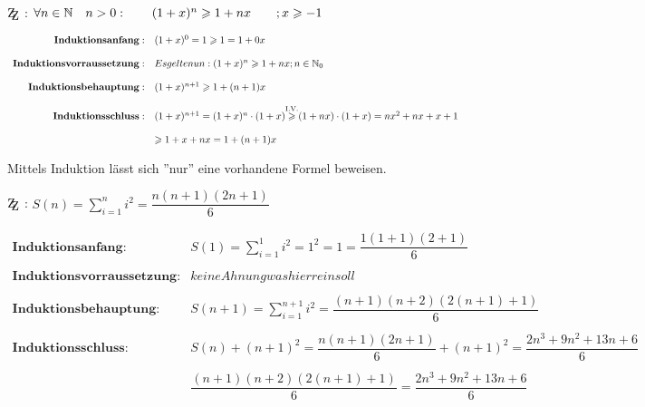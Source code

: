 \documentclass[main.tex]{subfiles}
\begin{document}
\begin{Beweis}
	$\mathrm{Z\kern-.3em\raise-0.5ex\hbox{Z}}$ : $ \forall n \in \mathbb{N} \quad n>0 :  \qquad (1+x)^n \geqslant 1+nx  \qquad;  x\geqslant -1$

	$\begin{array}{rl}
		\textbf{Induktionsanfang}: & (1+x)^0 = 1 \geqslant 1 = 1+0x \\\\
		\textbf{Induktionsvorraussetzung}: & Es gelte nun: (1+x)^n \geqslant 1+nx ; n\in \mathbb{N}_{0} \\\\
		\textbf{Induktionsbehauptung}: &  (1+x)^{n+1} \geqslant 1+(n+1)x \\\\
		\textbf{Induktionsschluss}: &  (1+x)^{n+1} = (1+x)^n \cdot (1+x) {\overset{\text{I.V.}} {\geqslant}} (1+nx)\cdot(1+x) = nx^2+nx+x+1\\\\
		&\geqslant 1+x+nx = 1+(n+1)x
	\end{array}$
\end{Beweis}


\begin{Beweis}
	Mittels Induktion lässt sich ''nur''  eine vorhandene Formel beweisen.

	$\mathrm{Z\kern-.3em\raise-0.5ex\hbox{Z}}$ : $S(n) = \sum\limits_{i=1}^n i^2 = \dfrac{n(n+1)(2n+1)}{6}$

	$\begin{array}{rl}
		\textbf{Induktionsanfang}: &  S(1) = \sum\limits_{i=1}^1 i^2 = 1^2 = 1 = \dfrac{1(1+1)(2+1)}{6}\\\\
		\textbf{Induktionsvorraussetzung}: & keine Ahnung was hier rein soll\\\\
		\textbf{Induktionsbehauptung}: & S(n+1)=\sum\limits_{i=1}^{n+1} i^2 = \dfrac{(n+1)(n+2)(2(n+1)+1)}{6}\\\\
		\textbf{Induktionsschluss}: & S(n) +(n+1)^2 = \dfrac{n(n+1)(2n+1)}{6} +(n+1)^2 = \dfrac{2n^3 +9n^2+13n+6}{6}\\\\
		& \dfrac{(n+1)(n+2)(2(n+1)+1)}{6}  = \dfrac{2n^3 +9n^2+13n+6}{6} \\\\
	\end{array}$
\end{Beweis}
\end{document}
